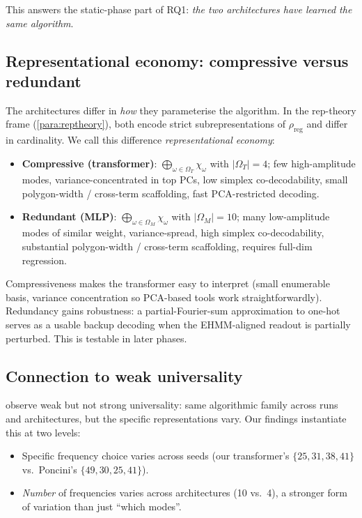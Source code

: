 \documentclass[11pt,a4paper]{article}
\begin{document}
This answers the static-phase part of RQ1: \emph{the two architectures have learned the same algorithm}.

\subsection{Representational economy: compressive versus redundant}\label{sec:economy}

The architectures differ in \emph{how} they parameterise the algorithm. In the rep-theory frame (\cref{para:reptheory}), both encode strict subrepresentations of $\rho_{\mathrm{reg}}$ and differ in cardinality. We call this difference \emph{representational economy}:

\begin{itemize}
    \item \textbf{Compressive (transformer)}: $\bigoplus_{\omega \in \Omega_T} \chi_\omega$ with $|\Omega_T| = 4$; few high-amplitude modes, variance-concentrated in top PCs, low simplex co-decodability, small polygon-width / cross-term scaffolding, fast PCA-restricted decoding.
    \item \textbf{Redundant (MLP)}: $\bigoplus_{\omega \in \Omega_M} \chi_\omega$ with $|\Omega_M| = 10$; many low-amplitude modes of similar weight, variance-spread, high simplex co-decodability, substantial polygon-width / cross-term scaffolding, requires full-dim regression.
\end{itemize}

Compressiveness makes the transformer easy to interpret (small enumerable basis, variance concentration so PCA-based tools work straightforwardly). Redundancy gains robustness: a partial-Fourier-sum approximation to one-hot serves as a usable backup decoding when the EHMM-aligned readout is partially perturbed. This is testable in later phases.

\subsection{Connection to weak universality}\label{sec:universality}

\citet{chughtai2023toy} observe weak but not strong universality: same algorithmic family across runs and architectures, but the specific representations vary. Our findings instantiate this at two levels:
\begin{itemize}
    \item Specific frequency choice varies across seeds (our transformer's $\{25, 31, 38, 41\}$ vs.\ Poncini's $\{49, 30, 25, 41\}$).
    \item \emph{Number} of frequencies varies across architectures (10 vs.\ 4), a stronger form of variation than just ``which modes''.
\end{itemize}
\end{document}
